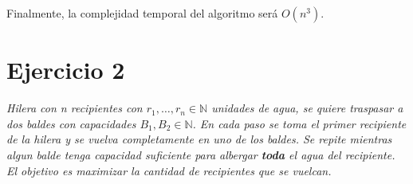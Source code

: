 \documentclass[12pt, a4paper]{report}
\theoremstyle{definition} %
\begin{document}
\begin{enumerate}[a), resume]
    Finalmente, la complejidad temporal del algoritmo será $O(n^3)$.

\end{enumerate}

\newpage
\section*{Ejercicio 2}

\textit{Hilera con n recipientes con $r_1, \ldots, r_n \in \mathbb{N}$ unidades de agua, se quiere traspasar a dos baldes con capacidades $B_1, B_2 \in \mathbb{N}$. En cada paso se toma el primer recipiente de la hilera y se vuelva completamente en uno de los baldes. Se repite mientras algun balde tenga capacidad suficiente para albergar \textbf{toda} el agua del recipiente. El objetivo es maximizar la cantidad de recipientes que se vuelcan.}
\end{document}
